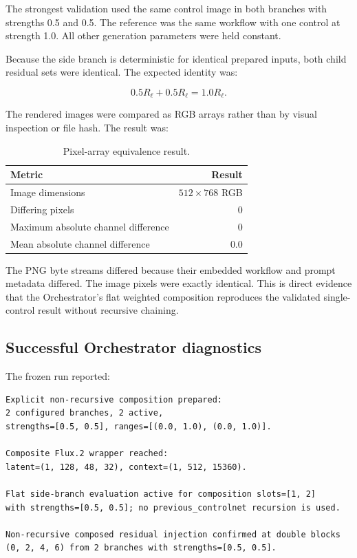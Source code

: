 \documentclass[11pt]{article}
\begin{document}
The strongest validation used the same control image in both branches with strengths 0.5 and 0.5. The reference was the same workflow with one control at strength 1.0. All other generation parameters were held constant.

Because the side branch is deterministic for identical prepared inputs, both child residual sets were identical. The expected identity was:

\[
  0.5R_{\ell}+0.5R_{\ell}=1.0R_{\ell}.
\]

The rendered images were compared as RGB arrays rather than by visual inspection or file hash. The result was:

\begin{table}[H]
\centering
\caption{Pixel-array equivalence result.}
\begin{tabular}{@{}lr@{}}
\toprule
Metric & Result \\
\midrule
Image dimensions & $512\times768$ RGB \\
Differing pixels & 0 \\
Maximum absolute channel difference & 0 \\
Mean absolute channel difference & 0.0 \\
\bottomrule
\end{tabular}
\end{table}

The PNG byte streams differed because their embedded workflow and prompt metadata differed. The image pixels were exactly identical. This is direct evidence that the Orchestrator's flat weighted composition reproduces the validated single-control result without recursive chaining.

\subsection{Successful Orchestrator diagnostics}

The frozen run reported:

\begin{lstlisting}[style=textstyle,caption={Representative non-recursive composition diagnostics.}]
Explicit non-recursive composition prepared:
2 configured branches, 2 active,
strengths=[0.5, 0.5], ranges=[(0.0, 1.0), (0.0, 1.0)].

Composite Flux.2 wrapper reached:
latent=(1, 128, 48, 32), context=(1, 512, 15360).

Flat side-branch evaluation active for composition slots=[1, 2]
with strengths=[0.5, 0.5]; no previous_controlnet recursion is used.

Non-recursive composed residual injection confirmed at double blocks
(0, 2, 4, 6) from 2 branches with strengths=[0.5, 0.5].
\end{lstlisting}
\end{document}
